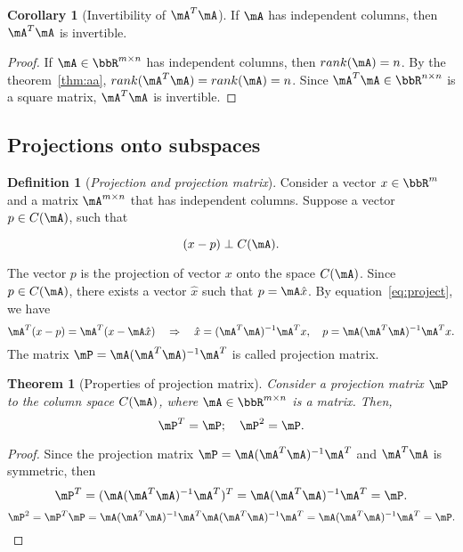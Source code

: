 \documentclass[11pt]{article}
\theoremstyle{plain}
\newtheorem{thm}{Theorem}[section]
\theoremstyle{definition}
\newtheorem{defn}{Definition}
\newtheorem{cor}{Corollary}
\begin{document}
\begin{cor}[Invertibility of $\mA^T \mA$]\label{cor:invert}
	If $\mA$ has independent columns, then $\mA^T \mA$ is invertible.
\end{cor}
\begin{proof}
	If $\mA \in \bbR^{m \times n}$ has independent columns, then $rank(\mA) = n$. By the theorem~\ref{thm:aa}, $rank(\mA^T \mA) = rank(\mA) = n$. Since $\mA^T \mA \in \bbR^{n \times n}$ is a square matrix, $\mA^T \mA$ is invertible.
\end{proof}


\subsection{Projections onto subspaces}
\begin{defn}[\textit{Projection and projection matrix}]\label{def:project}
	Consider a vector $x \in \bbR^{m}$ and a matrix $\mA^{m \times n}$ that has independent columns. Suppose a vector $p \in C(\mA)$, such that
	
	\begin{equation}\label{eq:project}
		(x-p) \perp C(\mA). 
	\end{equation} 
	
	The vector $p$ is the projection of vector $x$ onto the space $C(\mA)$. Since $p \in C(\mA)$, there exists a vector $\hat x$ such that $p = \mA \hat x$. By equation~\eqref{eq:project}, we have
	\[ \mA^T (x - p) = \mA^T(x - \mA \hat x) \quad  \Rightarrow\quad  \hat x = (\mA^T \mA)^{-1} \mA^T x,\quad p = \mA(\mA^T \mA)^{-1} \mA^T x.  \] 
	The matrix $\mP =  \mA(\mA^T \mA)^{-1} \mA^T$ is called projection matrix.
\end{defn}

\begin{thm}[Properties of projection matrix]\label{thm:projectm}
	Consider a projection matrix $\mP$ to the column space $C(\mA)$, where $\mA \in \bbR^{m \times n}$ is a matrix. Then,
	\begin{equation}\label{eq:projectm}
		\mP^T = \mP;\quad  \mP^2 = \mP.
	\end{equation}
\end{thm}
\begin{proof}
	Since the projection matrix $\mP =   \mA(\mA^T \mA)^{-1} \mA^T$ and $\mA^T \mA$ is symmetric, then
	\[  \mP^T = (\mA(\mA^T \mA)^{-1} \mA^T )^T = \mA (\mA^T \mA)^{-1} \mA^T = \mP. \]
	\[  \mP^2 = \mP^T \mP =  \mA (\mA^T \mA)^{-1} \mA^T  \mA (\mA^T \mA)^{-1} \mA^T =  \mA (\mA^T \mA)^{-1} \mA^T = \mP. \]
\end{proof}
\end{document}

